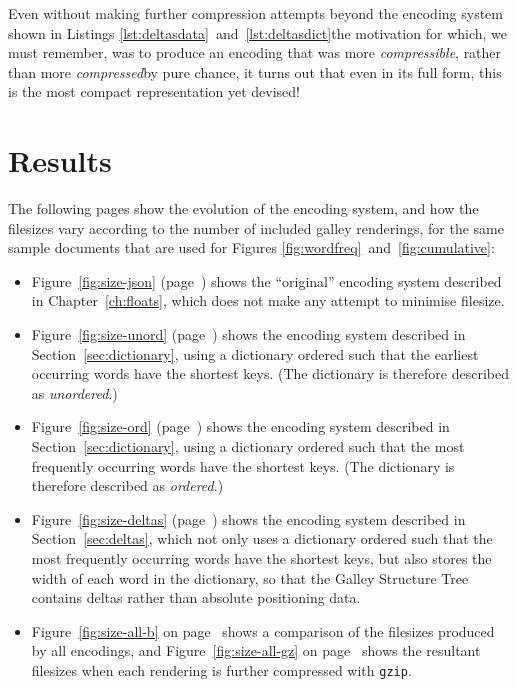Even without making further compression attempts beyond the encoding system shown in Listings \ref{lst:deltasdata}~and~\ref{lst:deltasdict}\ed the motivation for which, we must remember, was to produce an encoding that was more \emph{compressible}, rather than more \emph{compressed}\ed by pure chance, it turns out that even in its full form, this is the most compact representation yet devised!



\section{Results}

The following pages show the evolution of the encoding system, and how the filesizes vary according to the number of included galley renderings, for the same sample documents that are used for Figures \ref{fig:wordfreq}~and~\ref{fig:cumulative}:

\begin{itemize}

 \item Figure~\ref{fig:size-json} (page~\pageref{fig:size-json}) shows the ``original'' encoding system described in Chapter~\ref{ch:floats}, which does not make any attempt to minimise filesize.

 \item Figure~\ref{fig:size-unord} (page~\pageref{fig:size-unord}) shows the encoding system described in Section~\ref{sec:dictionary}, using a dictionary ordered such that the earliest occurring words have the shortest keys. (The dictionary is therefore described as \emph{unordered}.)

 \item Figure~\ref{fig:size-ord} (page~\pageref{fig:size-ord}) shows the encoding system described in Section~\ref{sec:dictionary}, using a dictionary ordered such that the most frequently occurring words have the shortest keys. (The dictionary is therefore described as \emph{ordered}.)

 \item Figure~\ref{fig:size-deltas} (page~\pageref{fig:size-deltas}) shows the encoding system described in Section~\ref{sec:deltas}, which not only uses a dictionary ordered such that the most frequently occurring words have the shortest keys, but also stores the width of each word in the dictionary, so that the Galley Structure Tree contains deltas rather than absolute positioning data.
 
 \item Figure~\ref{fig:size-all-b} on page~\pageref{fig:size-all-b} shows a comparison of the filesizes produced by all encodings, and Figure~\ref{fig:size-all-gz} on page~\pageref{fig:size-all-gz} shows the resultant filesizes when each rendering is further compressed with \texttt{gzip}.
\end{itemize}



